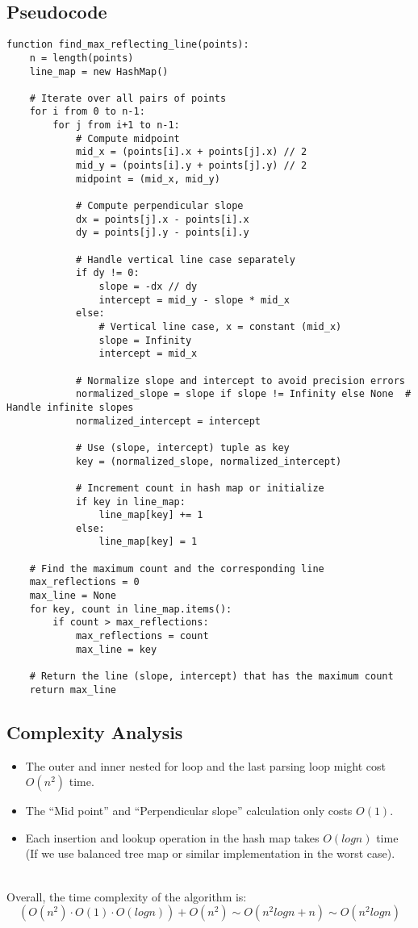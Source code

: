 \documentclass{article}
\begin{document}
\subsection*{Pseudocode}
\begin{verbatim}
function find_max_reflecting_line(points):
    n = length(points)
    line_map = new HashMap()

    # Iterate over all pairs of points
    for i from 0 to n-1:
        for j from i+1 to n-1:
            # Compute midpoint
            mid_x = (points[i].x + points[j].x) // 2
            mid_y = (points[i].y + points[j].y) // 2
            midpoint = (mid_x, mid_y)

            # Compute perpendicular slope
            dx = points[j].x - points[i].x
            dy = points[j].y - points[i].y

            # Handle vertical line case separately
            if dy != 0:
                slope = -dx // dy
                intercept = mid_y - slope * mid_x
            else:
                # Vertical line case, x = constant (mid_x)
                slope = Infinity
                intercept = mid_x

            # Normalize slope and intercept to avoid precision errors
            normalized_slope = slope if slope != Infinity else None  # Handle infinite slopes
            normalized_intercept = intercept

            # Use (slope, intercept) tuple as key
            key = (normalized_slope, normalized_intercept)

            # Increment count in hash map or initialize
            if key in line_map:
                line_map[key] += 1
            else:
                line_map[key] = 1

    # Find the maximum count and the corresponding line
    max_reflections = 0
    max_line = None
    for key, count in line_map.items():
        if count > max_reflections:
            max_reflections = count
            max_line = key

    # Return the line (slope, intercept) that has the maximum count
    return max_line
\end{verbatim}

\subsection*{Complexity Analysis}
\begin{itemize}
    \item The outer and inner nested for loop and the last parsing loop might cost $O(n^2)$ time.
    \item The ``Mid point'' and ``Perpendicular slope'' calculation only costs $O(1)$.
    \item Each insertion and lookup operation in the hash map takes $O(logn)$ time (If we use balanced tree map or similar implementation in the worst case).
\end{itemize}
\\
Overall, the time complexity of the algorithm is:
\[ (O(n^2) \cdot O(1) \cdot O(logn)) + O(n^2) \sim O(n^2logn + n) \sim O(n^2logn) \]
\end{document}
